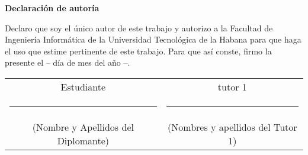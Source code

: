{\Large \textbf{Declaración de autoría} \vspace{.3cm}}

Declaro que soy el único autor de este trabajo y autorizo a la Facultad de Ingeniería Informática de la Universidad Tecnológica de la Habana para que haga el uso que estime pertinente de este trabajo. Para que así conste, firmo la presente el -- día de mes del año --.

\vspace{3cm}

\begingroup	

\setlength{\tabcolsep}{10pt} %
\renewcommand{\arraystretch}{0.5} %
\centering
\begin{tabular}{c c}
	
	Estudiante  & tutor 1 \\
	\noindent\rule{6cm}{0.4pt} & \noindent\rule{6cm}{0.4pt} \\
	(Nombre y Apellidos del Diplomante) &  	(Nombres y apellidos del Tutor 1)	
\end{tabular}
\vspace{3cm}

\endgroup

